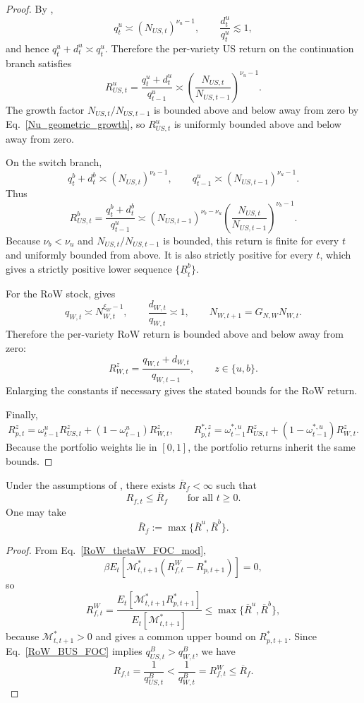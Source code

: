 \documentclass{article}
\begin{document}
\begin{proof}
By ,
\[
q_t^u\asymp (N_{US,t})^{\nu_u-1},
\qquad
\frac{d_t^u}{q_t^u}\lesssim 1,
\]
and hence $q_t^u+d_t^u\asymp q_t^u$. Therefore the per-variety US return on the continuation branch satisfies
\[
R_{US,t}^u
=
\frac{q_t^u+d_t^u}{q_{t-1}^u}
\asymp
\left(\frac{N_{US,t}}{N_{US,t-1}}\right)^{\nu_u-1}.
\]
The growth factor $N_{US,t}/N_{US,t-1}$ is bounded above and below away from zero by Eq.~\eqref{Nu_geometric_growth}, so $R_{US,t}^u$ is uniformly bounded above and below away from zero.

On the switch branch,
\[
q_t^b+d_t^b\asymp (N_{US,t})^{\nu_b-1},
\qquad
q_{t-1}^u\asymp (N_{US,t-1})^{\nu_u-1}.
\]
Thus
\[
R_{US,t}^b
=
\frac{q_t^b+d_t^b}{q_{t-1}^u}
\asymp
(N_{US,t-1})^{\nu_b-\nu_u}
\left(\frac{N_{US,t}}{N_{US,t-1}}\right)^{\nu_b-1}.
\]
Because $\nu_b<\nu_u$ and $N_{US,t}/N_{US,t-1}$ is bounded, this return is finite for every $t$ and uniformly bounded from above. It is also strictly positive for every $t$, which gives a strictly positive lower sequence $\{\underline R_t^b\}$. 

For the RoW stock,  gives
\[
q_{W,t}\asymp N_{W,t}^{\xi_W-1},
\qquad
\frac{d_{W,t}}{q_{W,t}}\asymp 1,
\qquad
N_{W,t+1}=G_{N,W}N_{W,t}.
\]
Therefore the per-variety RoW return is bounded above and below away from zero:
\[
R_{W,t}^z
=
\frac{q_{W,t}+d_{W,t}}{q_{W,t-1}},
\qquad
z\in\{u,b\}.
\]
Enlarging the constants if necessary gives the stated bounds for the RoW return.

Finally,
\[
R_{p,t}^z=\omega_{t-1}^uR_{US,t}^z+(1-\omega_{t-1}^u)R_{W,t}^z,
\qquad
R_{p,t}^{*,z}=\omega_{t-1}^{*,u}R_{US,t}^z+(1-\omega_{t-1}^{*,u})R_{W,t}^z.
\]
Because the portfolio weights lie in $[0,1]$, the portfolio returns inherit the same bounds.
\end{proof}

\begin{lem}\label{lem_rf_upper_bound}
Under the assumptions of , there exists $\overline R_f<\infty$ such that
\[
R_{f,t}\le \overline R_f
\qquad\text{for all }t\ge 0.
\]
One may take
\[
\overline R_f:=\max\{\overline R^u,\overline R^b\}.
\]
\end{lem}

\begin{proof}
From Eq.~\eqref{RoW_thetaW_FOC_mod},
\[
\beta E_t\!\left[\mathcal M_{t,t+1}^*(R_{f,t}^W-R_{p,t+1}^*)\right]=0,
\]
so
\[
R_{f,t}^W
=
\frac{E_t\!\left[\mathcal M_{t,t+1}^*R_{p,t+1}^*\right]}{E_t\!\left[\mathcal M_{t,t+1}^*\right]}
\le
\max\{\overline R^u,\overline R^b\},
\]
because $\mathcal M_{t,t+1}^*>0$ and  gives a common upper bound on $R_{p,t+1}^*$. Since Eq.~\eqref{RoW_BUS_FOC} implies $q^B_{US,t}>q^B_{W,t}$, we have
\[
R_{f,t}=\frac{1}{q^B_{US,t}}<\frac{1}{q^B_{W,t}}=R_{f,t}^W\le \overline R_f.
\]
\end{proof}
\end{document}
